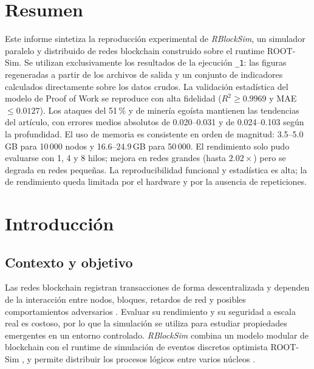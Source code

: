 \documentclass[11pt,a4paper,oneside]{article}
\begin{document}
\section*{Resumen}

Este informe sintetiza la reproducción experimental de \emph{RBlockSim}, un simulador paralelo y distribuido de redes blockchain construido sobre el runtime ROOT-Sim. Se utilizan exclusivamente los resultados de la ejecución \texttt{\_1}: las figuras regeneradas a partir de los archivos de salida y un conjunto de indicadores calculados directamente sobre los datos crudos. La validación estadística del modelo de Proof of Work se reproduce con alta fidelidad ($R^2 \ge 0.9969$ y MAE $\le 0.0127$). Los ataques del 51\,\% y de minería egoísta mantienen las tendencias del artículo, con errores medios absolutos de 0.020--0.031 y de 0.024--0.103 según la profundidad. El uso de memoria es consistente en orden de magnitud: 3.5--5.0\,GB para 10\,000 nodos y 16.6--24.9\,GB para 50\,000. El rendimiento solo pudo evaluarse con 1, 4 y 8 hilos; mejora en redes grandes (hasta $2.02\times$) pero se degrada en redes pequeñas. La reproducibilidad funcional y estadística es alta; la de rendimiento queda limitada por el hardware y por la ausencia de repeticiones.

\section{Introducción}

\subsection{Contexto y objetivo}

Las redes blockchain registran transacciones de forma descentralizada y dependen de la interacción entre nodos, bloques, retardos de red y posibles comportamientos adversarios \cite{nakamoto2008bitcoin}. Evaluar su rendimiento y su seguridad a escala real es costoso, por lo que la simulación se utiliza para estudiar propiedades emergentes en un entorno controlado. \emph{RBlockSim} \cite{pimpini2025rblocksim} combina un modelo modular de blockchain con el runtime de simulación de eventos discretos optimista ROOT-Sim \cite{pellegrini2012rootsim}, y permite distribuir los procesos lógicos entre varios núcleos \cite{fujimoto1990pdes}.
\end{document}
